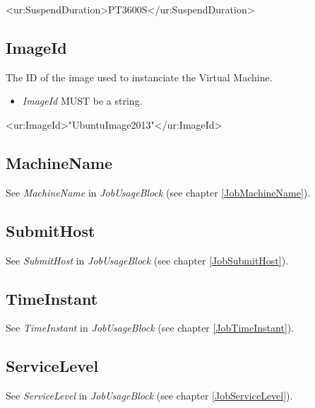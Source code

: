 \begin{XMLexample}
<ur:SuspendDuration>PT3600S</ur:SuspendDuration>
\end{XMLexample}





\subsection{ImageId}

The ID of the image used to instanciate the Virtual Machine.

\begin{itemize}
\item \emph{ImageId} MUST be a string.
\end{itemize}

\begin{XMLexample}
<ur:ImageId>"UbuntuImage2013"</ur:ImageId>
\end{XMLexample}




\subsection{MachineName}

See \emph{MachineName} in \emph{JobUsageBlock} (see chapter \ref{JobMachineName}).






\subsection{SubmitHost}

See \emph{SubmitHost} in \emph{JobUsageBlock} (see chapter \ref{JobSubmitHost}).






\subsection{TimeInstant}

See \emph{TimeInstant} in \emph{JobUsageBlock} (see chapter \ref{JobTimeInstant}).






\subsection{ServiceLevel}

See \emph{ServiceLevel} in \emph{JobUsageBlock} (see chapter \ref{JobServiceLevel}).





